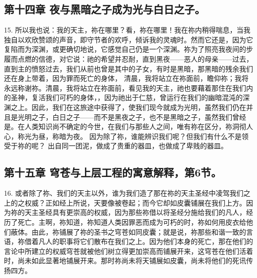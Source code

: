 
\subsection{第十四章 夜与黑暗之子成为光与白日之子。}

15. 所以我也说：我的天主，祢在哪里？看，祢在哪里！我在祢内稍得喘息，当我独自以欢欣赞颂的声音，即守节者的欢呼，倾诉我的灵魂时。然而它还是，因为它复陷而为深渊，或更确切地说，它感觉自己仍是一个深渊。祢为了照亮我夜间的步履而点燃的信德，对它说：祂的希望并忍耐，直到黑夜——恶人的母亲——过去，直到主的愤怒过去，我们从前也曾是其中的子女，有时是黑暗，那黑暗的残余我们还在身上带着，因为罪而死亡的身体，  清晨，我将站立在祢面前，瞻仰祢；我将永远称谢祢。清晨，我将站立在祢面前，看见我的天主，祂也要藉着那住在我们内的圣神，复活我们可朽的身体，，因为祂出于仁慈，曾运行在我们的幽暗混沌的深渊之上。因此，我们在这旅途中获得了，使我们现今就成为光明，虽然我们仍在并且是光明之子，白日之子——而不是黑夜之子，也不是黑暗之子，虽然我们曾经是。在人类知识尚不确定的今世，在我们与那些人之间，唯有祢在区分，祢洞彻人心，称光为昼，称暗为夜。 因为除了祢，谁能辨识我们呢？但我们有什么不是领受于祢的呢？ 出自同一团泥，做成了贵重的器皿，也做成了卑贱的器皿。\par


\subsection{第十五章 穹苍与上层工程的寓意解释，第6节。}

16. 或者除了祢、我们的天主以外，谁为我们造了那在祢的天主圣经中凌驾我们之上的之权威？正如经上所说，天要像被卷起；而今它却如皮囊铺展在我们上方。因为祢的天主圣经具有更崇高的权威，因为那些祢借以将圣经分施给我们的凡人，经历了死亡。主啊，祢知道，祢知道人类因罪恶而成为可朽的时，祢如何用皮衣给他们蔽体。由此，祢铺展了祢的圣书之穹苍如同皮囊；就是说，祢那些和谐一致的言语，祢借着凡人的职事将它们散布在我们之上。因为他们本身的死亡，那在他们的言论中所建立的权威穹苍就被他们树立得更加崇高而铺展开来，这穹苍在他们活着时，尚未如此显著地铺展开来。那时祢尚未将天铺展如皮囊，尚未将他们的死讯传扬四方。\par

